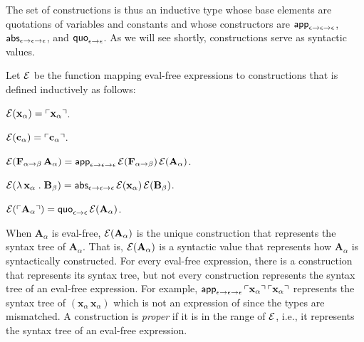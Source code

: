 \documentclass[fleqn]{llncs}
\begin{document}
\ee

\noindent
The set of constructions is thus an inductive type whose base elements
are quotations of variables and constants and whose constructors are
$\mbox{\sf app}_{\epsilon \rightarrow \epsilon \rightarrow \epsilon}$,
$\mbox{\sf abs}_{\epsilon \rightarrow \epsilon \rightarrow \epsilon}$, and
$\mbox{\sf quo}_{\epsilon \rightarrow \epsilon}$.  As we will see shortly,
constructions serve as syntactic values.

{Let $\mbox{$\cal E$}$ be the function mapping eval-free expressions to
constructions that is defined inductively as follows:}

\be

  \item $\mbox{$\cal E$}(\textbf{x}_\alpha) = \ulcorner\textbf{x}_\alpha\urcorner$.

  \item $\mbox{$\cal E$}(\textbf{c}_\alpha) = \ulcorner\textbf{c}_\alpha\urcorner$.

  \item $\mbox{$\cal E$}(\textbf{F}_{\alpha \rightarrow \beta} \, \textbf{A}_\alpha) =
    \mbox{\sf app}_{\epsilon \rightarrow \epsilon \rightarrow \epsilon} \,
    \mbox{$\cal E$}(\textbf{F}_{\alpha \rightarrow \beta}) \, \mbox{$\cal E$}(\textbf{A}_\alpha)$.

  \item $\mbox{$\cal E$}(\lambda\, \textbf{x}_\alpha \mathrel. \textbf{B}_\beta) =
    \mbox{\sf abs}_{\epsilon \rightarrow \epsilon \rightarrow \epsilon} \,
    \mbox{$\cal E$}(\textbf{x}_\alpha) \, \mbox{$\cal E$}(\textbf{B}_\beta)$.

  \item $\mbox{$\cal E$}(\ulcorner\textbf{A}_\alpha\urcorner) = \mbox{\sf quo}_{\epsilon
    \rightarrow \epsilon} \, \mbox{$\cal E$}(\textbf{A}_\alpha)$.

\ee

\noindent
When $\textbf{A}_\alpha$ is eval-free, $\mbox{$\cal E$}(\textbf{A}_\alpha)$ is the
unique construction that represents the syntax tree of
$\textbf{A}_\alpha$.  That is, $\mbox{$\cal E$}(\textbf{A}_\alpha)$ is a syntactic
value that represents how $\textbf{A}_\alpha$ is syntactically
constructed.  For every eval-free expression, there is a construction
that represents its syntax tree, but not every construction represents
the syntax tree of an eval-free expression.  For example,
$\mbox{\sf app}_{\epsilon \rightarrow \epsilon \rightarrow \epsilon} \,
\ulcorner\textbf{x}_\alpha\urcorner \, \ulcorner\textbf{x}_\alpha\urcorner$
represents the syntax tree of $(\textbf{x}_\alpha \,
\textbf{x}_\alpha)$ which is not an expression of {\churchqe} since
the types are mismatched.  A construction is \emph{proper} if it is in
the range of $\mbox{$\cal E$}$, i.e., it represents the syntax tree of an
eval-free expression.
\end{document}
